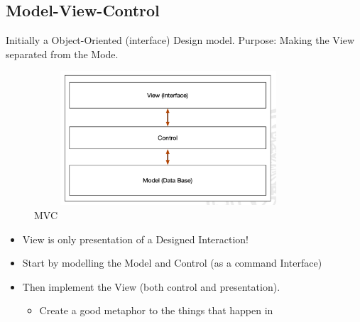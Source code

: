 \begin{multicols}{2}
\section{Model-View-Control}
Initially a Object-Oriented (interface) Design model.
Purpose: Making the View separated from the Mode.

\begin{figure}[h]
    \vspace{10mm}
    \centering
    \includegraphics[width=10cm, height=5cm]{image/mvc.png}
    \caption{MVC}
\end{figure}

\begin{itemize}
\item View is only presentation of a Designed Interaction!
\item Start by modelling the Model and Control (as a command Interface)
\item Then implement the View (both control and presentation).
  \begin{itemize}
  \item Create a good metaphor to the things that happen in
  \end{itemize}
\end{itemize}

\end{multicols}